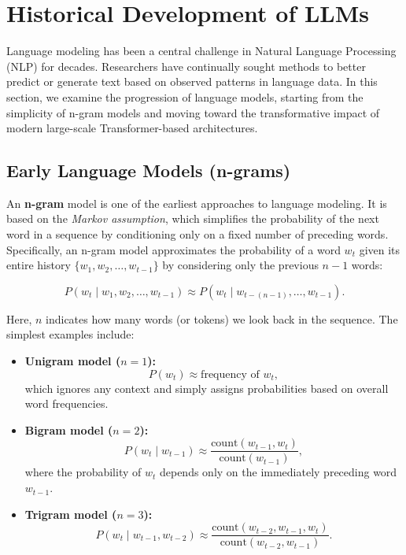 \section{Historical Development of LLMs}
\label{sec:historical}
\noindent
Language modeling has been a central challenge in Natural Language Processing (NLP) for decades. Researchers have continually sought methods to better predict or generate text based on observed patterns in language data. In this section, we examine the progression of language models, starting from the simplicity of n-gram models and moving toward the transformative impact of modern large-scale Transformer-based architectures.


\subsection{Early Language Models (n-grams)}
\label{sec:early_n_grams}

\noindent
An \textbf{n-gram} model is one of the earliest approaches to language modeling. It is based on the \emph{Markov assumption}, which simplifies the probability of the next word in a sequence by conditioning only on a fixed number of preceding words. Specifically, an n-gram model approximates the probability of a word $w_t$ given its entire history $\{w_1, w_2, \ldots, w_{t-1}\}$ by considering only the previous $n-1$ words:

\[
P(w_t \mid w_1, w_2, \ldots, w_{t-1}) \approx P(w_t \mid w_{t-(n-1)}, \ldots, w_{t-1}).
\]

\noindent
Here, $n$ indicates how many words (or tokens) we look back in the sequence. The simplest examples include:
\begin{itemize}
    \item \textbf{Unigram model ($n = 1$):}
    \[
    P(w_t) \approx \text{frequency of } w_t,
    \]
    which ignores any context and simply assigns probabilities based on overall word frequencies.

    \item \textbf{Bigram model ($n = 2$):}
    \[
    P(w_t \mid w_{t-1}) \approx \frac{\text{count}(w_{t-1}, w_t)}{\text{count}(w_{t-1})},
    \]
    where the probability of $w_t$ depends only on the immediately preceding word $w_{t-1}$.

    \item \textbf{Trigram model ($n = 3$):}
    \[
    P(w_t \mid w_{t-1}, w_{t-2}) \approx \frac{\text{count}(w_{t-2}, w_{t-1}, w_t)}{\text{count}(w_{t-2}, w_{t-1})}.
    \]
\end{itemize}

